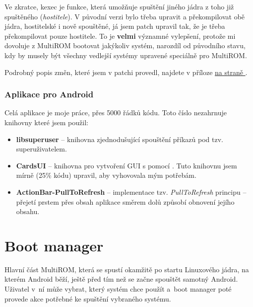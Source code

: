 \documentclass[12pt, a4paper, oneside]{article}
\newcommand{\B}{\textbf} %
\newcommand{\It}{\textit}  %
\newcommand*{\attref}[1]{\hyperref[{#1}]{\uv{\nameref*{#1}} na straně \pageref{#1}}}
\begin{document}
Ve zkratce, kexec je funkce, která umožňuje spuštění jiného jádra z toho již spuštěného (\It{hostitele}). V původní verzi bylo třeba upravit a překompilovat obě jádra, hostitelské i nově spouštěné, já jsem patch upravil tak, že je třeba překompilovat pouze hostitele. To je \B{velmi} významné vylepšení, protože mi dovoluje z MultiROM bootovat jakýkoliv systém, narozdíl od původního stavu, kdy by musely být všechny vedlejší systémy upravené speciálně pro MultiROM.

Podrobný popis změn, které jsem v patchi provedl, najdete v příloze \attref{sec:kexec-hardboot}.

\subsubsection{Aplikace pro Android}
Celá aplikace je moje práce, přes 5000 řádků kódu. Toto číslo nezahrnuje knihovny které jsem použil:
\begin{itemize}
    \item \B{libsuperuser} -- knihovna zjednodušující spouštění příkazů pod tzv. superuživatelem.
    \item \B{CardsUI} -- knihovna pro vytvoření GUI s pomocí . Tuto knihovnu jsem mírně (25\% kódu) upravil, aby vyhovovala mým potřebám.
    \item \B{ActionBar-PullToRefresh} -- implementace tzv. \It{PullToRefresh} principu -- přejetí prstem přes obsah aplikace směrem dolů způsobí obnovení jejího obsahu.
\end{itemize}

\newpage
\section{Boot manager}
Hlavní část MultiROM, která se spustí okamžitě po startu Linuxového jádra, na kterém Android běží, ještě před tím než se začne spouštět samotný Android. Uživatel v~ní může vybrat, který systém chce použít a~boot manager poté provede akce potřebné ke spuštění vybraného systému.
\end{document}
